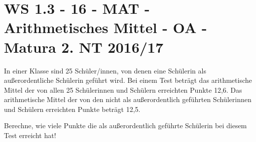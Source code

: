 \section{WS 1.3 - 16 - MAT - Arithmetisches Mittel - OA - Matura 2. NT 2016/17}

\begin{beispiel}[WS 1.3]{1} %
In einer Klasse sind 25 Schüler/innen, von denen eine Schülerin als außerordentliche Schülerin geführt wird. Bei einem Test beträgt das arithmetische Mittel der von allen 25 Schülerinnen und Schülern erreichten Punkte 12,6. Das arithmetische Mittel der von den nicht als außerordentlich geführten Schülerinnen und Schülern erreichten Punkte beträgt 12,5.\leer

Berechne, wie viele Punkte die als außerordentlich geführte Schülerin bei diesem Test erreicht hat!


\end{beispiel}